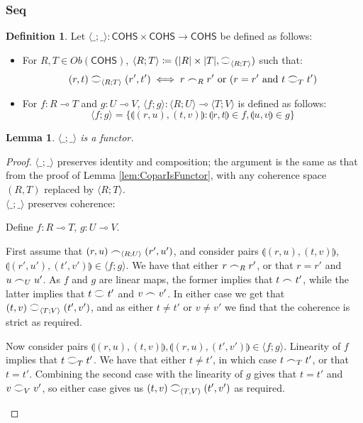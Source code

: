 \documentclass[11pt, oneside]{article}
\theoremstyle{plain}
\newtheorem{lemma}[theorem]{Lemma}
\theoremstyle{definition}
\newtheorem{definition}[theorem]{Definition}
\newcommand{\la}{\langle}
\newcommand{\ra}{\rangle}
\newcommand{\lp}{\llparenthesis}
\newcommand{\rp}{\rrparenthesis}
\newcommand{\cohs}{{\mathsf{COHS}}}
\newcommand{\coh}[1][]{\mathrel{\vcenter{\offinterlineskip\hbox{$\frown$}\vskip0.2ex\hbox{$\smile$}}_{\ifx\\#1\\\else#1\fi}}}
\newcommand{\scoh}[1][]{\mathrel{\frown}_{\ifx\\#1\\\else#1\fi}}
\begin{document}
\subsubsection{Seq}
\begin{definition}
    Let $\la\_;\_\ra:\cohs\times\cohs\to\cohs$ be defined as follows:
    \begin{itemize}
        \item
        For $R,T\in Ob(\cohs)$, $\la R;T\ra\coloneqq(|R|\times|T|,\coh[\la R;T\ra])$ such that:
        $$(r,t)\coh[\la R;T\ra](r',t') \iff r\scoh[R]r'\text{ or }(r=r'\text{ and }t\coh[T]t')$$

        \item
        For $f:R\multimap T$ and $g:U\multimap V$, 
        $\la f;g\ra:\la R;U\ra\multimap\la T;V\ra$ is defined as follows:
        $$\la f;g\ra=\{\lp(r,u),(t,v)\rp:\lp r,t\rp\in f,\lp u,v\rp\in g\}$$
    \end{itemize}
\end{definition}

\begin{lemma}
    $\la\_;\_\ra$ is a functor.
\end{lemma}

\begin{proof}
    $\la\_;\_\ra$ preserves identity and composition;
    the argument is the same as that from the proof of Lemma \ref{lem:CoparIsFunctor}, with any coherence space $(R,T)$ replaced by $\la R;T\ra$.\\

    $\la\_;\_\ra$ preserves coherence:
    \begin{adjustwidth}{1.5em}{}
        Define $f : R\multimap T$, $g : U\multimap V$.

        First assume that $(r,u)\scoh[\la R;U\ra](r',u')$, and consider pairs $\lp(r,u),(t,v)\rp$, $\lp(r',u'),(t',v')\rp\in \la f;g\ra$. 
        We have that either $r\scoh[R]r'$, or that $r=r'$ and $u\scoh[U]u'$.
        As $f$ and $g$ are linear maps, the former implies that $t\scoh t'$, while the latter implies that $t\coh t'$ and $v\scoh v'$.
        In either case we get that $(t,v)\coh[\la T;V\ra](t',v')$, and as either $t\neq t'$ or $v\neq v'$ we find that the coherence is strict as required.

        Now consider pairs $\lp(r,u),(t,v)\rp,\lp(r,u),(t',v')\rp\in\la f;g\ra$.
        Linearity of $f$ implies that $t\coh[T]t'$.
        We have that either $t\neq t'$, in which case $t\scoh[T]t'$, or that $t=t'$.
        Combining the second case with the linearity of $g$ gives that $t=t'$ and $v\coh[V]v'$, so either case gives us $(t,v)\coh[(T,V)](t',v')$ as required.
    \end{adjustwidth}
\end{proof}
\end{document}
